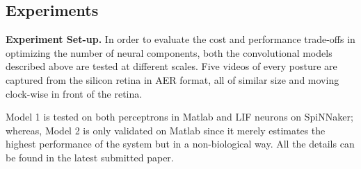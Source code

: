 \documentclass[journal]{journal}
\begin{document}
\subsection{Experiments}
\textbf{Experiment Set-up.}
In order to evaluate the cost and performance trade-offs in optimizing the number of neural components, both the convolutional models described above are tested at different scales. 
Five videos of every posture are captured from the silicon retina in AER format, all of similar size and moving clock-wise in front of the retina. 

Model 1 is tested on both perceptrons in Matlab and LIF neurons on SpiNNaker;
whereas, Model 2 is only validated on Matlab since it merely estimates the highest performance of the system but in a non-biological way.
All the details can be found in the latest submitted paper.



\end{document}
